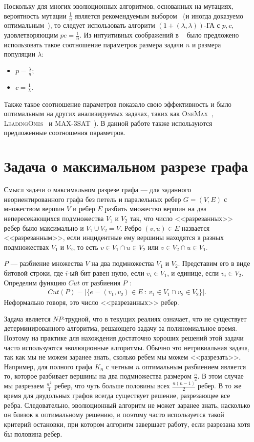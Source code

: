 \documentclass[times]{itmo-student-thesis}
\newcommand{\alglambdaf}{${(1 + (\lambda , \lambda))}$-ГА\xspace}
\newcommand{\onemax}{\textsc{OneMax}\xspace}
\newcommand{\leadingones}{\textsc{LeadingOnes}\xspace}
\begin{document}
Поскольку для многих эволюционных алгоритмов, основанных на мутациях, вероятность мутации $\frac{1}{n}$ является рекомендуемым выбором~\cite{DoerrDE15} (и иногда доказуемо  оптимальным~\cite{Cambridge2013}), то следует использовать алгоритм \alglambdaf с $p, c$, удовлетворяющим $pc = \frac{1}{n}$.
Из интуитивных соображений в ~\cite{DoerrDE15} было предложено использовать такое соотношение параметров размера задачи $n$ и размера популяции $\lambda$:
\begin{itemize}
 \item $p = \frac{\lambda}{n}$;
 \item $c = \frac{1}{\lambda}$.
 \end{itemize}
Также такое соотношение параметров показало свою эффективность и было оптимальным на других анализируемых задачах, таких как \onemax~\cite{DoerrDE15}, \leadingones~\cite{AntipovDK19} и MAX-3SAT~\cite{BuzdalovD17}). В данной работе также используются предложенные соотношения параметров.


\section{Задача о максимальном разрезе графа}

Смысл задачи о максимальном разрезе графа --- для заданного неориентированного графа без петель и паралельных ребер $G = (V, E)$ с множеством вершин $V$ и ребер $E$ разбить множество вершин на два непересекающихся подмножества $V_1$ и $V_2$ так, что число <<разрезанных>> ребер было максимально и $V_1 \cup V_2 = V$.
 Ребро $(v, u) \in E$ назвается <<разрезанным>>, если инцидентные ему вершины находятся в разных подмножествах $V_1$ и $V_2$, то есть $v \in V_1 \cap u \in V_2$ или $v \in V_2 \cap u \in V_1$.

$P$ --- разбиение множества $V$ на два подмножества $V_1$ и $V_2$.
Представим его в виде битовой строки, где $i$-ый бит равен нулю, если $v_i \in V_1$, и единице, если $v_i \in V_2$.
Определим функцию  $Cut$ от разбиения $P$ :
\begin{align*}
   Cut(P) = |\{e = (v_1, v_2) \in E ~:~ v_1 \in V_1 \cap v_2 \in V_2\}|.
\end{align*}
Неформально говоря, это число <<разрезанных>> ребер.

Задача является $NP$-трудной, что в текущих реалиях означает, что не существует детерминированного алгоритма, решающего задачу за полиномиальное время. Поэтому на практике для нахождения достаточно хороших решений этой задачи часто используются эволюционные алгоритмы.
Обычно это нетривиальная задача, так как мы не можем заранее знать, сколько ребем мы можем <<разрезать>>. Например, для полного графа $K_n$ с четным $n$ оптимальным разбиением является то, которое разбивает вершины на два подмножества размером $\frac{n}{2}$. В этом случае мы разрезаем $\frac{n^2}{4}$ ребер, что чуть больше половины всех $\frac{n(n-1)}{2}$ ребер. В то же время для двудольных графов всегда существует решение, разрезающее все ребра. Следовательно, эволюционный алгоритм не может заранее знать, насколько он близок к оптимальному решению, и поэтому часто используется такой критерий остановки, при котором алгоритм завершает работу, если разрезана хотя бы половина ребер.
\end{document}
